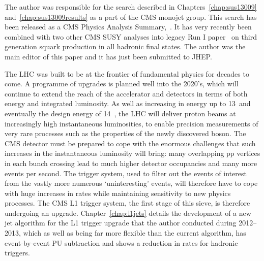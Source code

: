 The author was responsible for the search described in Chapters~\ref{chap:sus13009} and~\ref{chap:sus13009results} as a part of the CMS monojet group.
This search has been released as a CMS Physics Analysis Summary,~\cite{sus13009}. 
It has very recently been combined with two other CMS \ac{SUSY} analyses into legacy Run I paper~\cite{sus14001} on third generation squark production in all hadronic final states. 
The author was the main editor of this paper and it has just been submitted to \ac{JHEP}.




The LHC was built to be at the frontier of fundamental physics for decades to come. 
A programme of upgrades is planned well into the 2020's, which will continue to extend the reach of the accelerator and detectors in terms of both energy and integrated luminosity. 
As well as increasing in energy up to 13~\TeV and eventually the design energy of 14~\TeV, the LHC will deliver proton beams at increasingly high instantaneous luminosities, to enable precision measurements of very rare processes such as the properties of the newly discovered boson. 
The CMS detector must be prepared to cope with the enormous challenges that such increases in the instantaneous luminosity will bring: many overlapping pp vertices in each bunch crossing lead to much higher detector occupancies and many more events per second. 
The trigger system, used to filter out the events of interest from the vastly more numerous `uninteresting' events, will therefore have to cope with huge increases in rates while maintaining sensitivity to new physics processes. 
The CMS \ac{L1} trigger system, the first stage of this sieve, is therefore undergoing an upgrade. 
Chapter~\ref{chap:l1jets} details the development of a new jet algorithm for the \ac{L1} trigger upgrade that the author conducted during 2012--2013, which as well as being far more flexible than the current algorithm, has event-by-event \ac{PU} subtraction and shows a reduction in rates for hadronic triggers.





